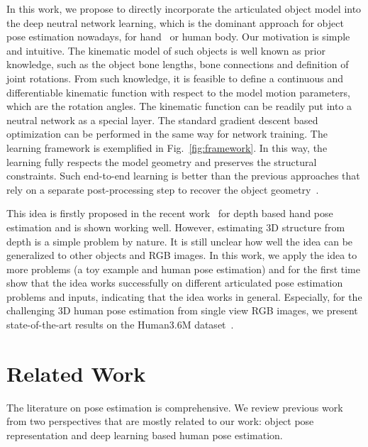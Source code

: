 \documentclass[runningheads]{llncs}
\begin{document}
In this work, we propose to directly incorporate the articulated object model into the deep neutral network learning, which is the dominant approach for object pose estimation nowadays, for hand~\cite{tompson14tog,supancic2015depth,oberweger2015hands,oberweger2015training,zhou2016model,Ge_2016_CVPR} or human body\cite{toshev2014deeppose,Wei_2016_CVPR,DBLP:journals/corr/NewellYD16,insafutdinov2016deepercut,li20143d,Li_2015_ICCV,Tekin_2016_CVPR,tekin2016structured,Zhou_2016_CVPR}. Our motivation is simple and intuitive. The kinematic model of such objects is well known as prior knowledge, such as the object bone lengths, bone connections and definition of joint rotations. From such knowledge, it is feasible to define a continuous and differentiable kinematic function with respect to the model motion parameters, which are the rotation angles. The kinematic function can be readily put into a neutral network as a special layer. The standard gradient descent based optimization can be performed in the same way for network training. The learning framework is exemplified in Fig.~\ref{fig:framework}. In this way, the learning fully respects the model geometry and preserves the structural constraints. Such end-to-end learning is better than the previous approaches that rely on a separate post-processing step to recover the object geometry~\cite{tompson14tog,Zhou_2016_CVPR}.

This idea is firstly proposed in the recent work~\cite{zhou2016model} for depth based hand pose estimation and is shown working well. However, estimating 3D structure from depth is a simple problem by nature. It is still unclear how well the idea can be generalized to other objects and RGB images. In this work, we apply the idea to more problems (a toy example and human pose estimation) and for the first time show that the idea works successfully on different articulated pose estimation problems and inputs, indicating that the idea works in general. Especially, for the challenging 3D human pose estimation from single view RGB images, we present state-of-the-art results on the Human3.6M dataset~\cite{h36m_pami}.


\section{Related Work}
The literature on pose estimation is comprehensive. We review previous work from two perspectives that are mostly related to our work: object pose representation and deep learning based human pose estimation.
\end{document}
